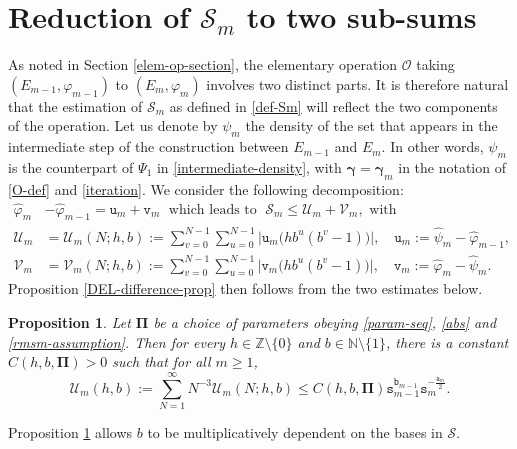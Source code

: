 \documentclass[12pt, twoside]{article}
\newtheorem{proposition}[theorem]{Proposition}
\theoremstyle{definition}
\numberwithin{equation}{section}
\begin{document}
\section{Reduction of $\mathscr{S}_m$ to two sub-sums} \label{subsum-reduction-section}
As noted in Section \ref{elem-op-section}, the elementary operation $\mathscr{O}$ taking $(E_{m-1}, \varphi_{m-1})$ to $(E_m, \varphi_m)$ involves two distinct parts. It is therefore natural that the estimation of $\mathscr{S}_m$ as defined in \eqref{def-Sm} will reflect the two components of the operation. Let us denote by $\psi_m$ the density of the set that appears in the intermediate step of the construction between $E_{m-1}$ and $E_m$. In other words, $\psi_m$ is the counterpart of $\Psi_1$ in \eqref{intermediate-density}, with $\pmb{\gamma} = \pmb{\gamma}_m$ in the notation of \eqref{O-def} and \eqref{iteration}. We consider the following decomposition:
\begin{align} 
\widehat{\varphi}_m  &- \widehat{\varphi}_{m-1} = \mathtt u_m + \mathtt v_m \; \text{ which leads to } \;   \mathscr{S}_m \leq \mathscr{U}_m + \mathscr{V}_m, \text{ with } \label{difference-decomp} \\
\mathscr{U}_m &= \mathscr{U}_m(N; h, b) := \sum_{v = 0}^{N-1} \sum_{u = 0}^{N-1} \bigl|\mathtt u_m \bigl(h b^u(b^v-1) \bigr) \bigr|, \quad \mathtt u_m := \widehat{\psi}_{m} - \widehat{\varphi}_{m-1}, \label{def-um} \\
 \mathscr{V}_m &= \mathscr{V}_m(N; h, b) := \sum_{v = 0}^{N-1} \sum_{u = 0}^{N-1} \bigl|\mathtt v_m \bigl(h b^u(b^v-1) \bigr) \bigr|, \quad  \mathtt {v}_m := \widehat{\varphi}_{m} - \widehat{\psi}_{m}. \label{def-vm}
\end{align}
Proposition \ref{DEL-difference-prop} then follows from the two estimates below. 
 \begin{proposition} \label{U-prop} 
Let $\pmb{\Pi}$ be a choice of parameters obeying \eqref{param-seq}, \eqref{abs} and \eqref{rmsm-assumption}. Then for every $h \in \mathbb Z \setminus \{0\}$ and $b \in \mathbb N \setminus \{1\}$, there is a constant $C(h, b, \pmb{\Pi}) > 0$ such that for all $m \geq 1$, 
\begin{equation} \label{Um-sum} 
\mathcal U_m(h, b) := \sum_{N=1}^{\infty} N^{-3} \mathscr{U}_m(N; h, b)   \leq C(h, b, \pmb{\Pi})  {\mathtt s_{m-1}^{\mathtt b_{m-1}}}{\mathtt s_m^{-\frac{\mathtt a_m}{2}}}.
\end{equation}   
\end{proposition} 
 Proposition \ref{U-prop} allows $b$ to be multiplicatively dependent on the bases in $\mathcal S$. 
\end{document}
